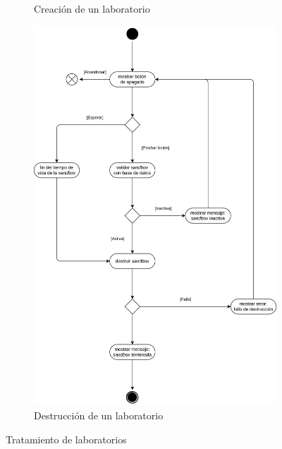\begin{figure}[h]
\begin{subfigure}{0.45\textwidth}
                    \caption{Creación de un laboratorio}
                    \label{fig:creacion-laboratorio}
                \end{subfigure}
                \hfill
                \begin{subfigure}{0.45\textwidth}
                    \centering
                    \includegraphics[scale=0.115]{images/Diagramas/Actividades y transiciones 5.png}
                    \caption{Destrucción de un laboratorio}
                    \label{fig:destruccion-laboratorio}
                \end{subfigure}

                \caption{Tratamiento de laboratorios}
                \label{fig:tratamiento-laboratorios}
            \end{figure}
            
